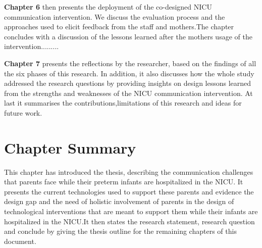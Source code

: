  \textbf{Chapter 6} then presents the deployment of the co-designed NICU communication intervention. We discuss the evaluation process and the approaches used to elicit feedback from the staff and mothers.The chapter concludes with a discussion of the lessons learned after the mothers usage of the intervention.........
 
  \textbf{Chapter 7} presents the reflections by the researcher, based on the findings of all the six phases of this research. In addition, it also discusses how the whole study addressed the research questions by providing insights on design lessons learned from the strengths and weaknesses of the NICU communication intervention. At last it summarises the contributions,limitations of this research and ideas for future work.
  

\section{Chapter Summary}
This chapter has introduced the thesis, describing the communication challenges that  parents face while their preterm infants are hospitalized in the NICU. It presents the current technologies used to support these parents and evidence the design gap and the need of holistic involvement of parents in the design of technological interventions that are meant to support them while their infants are hospitalized in the NICU.It then states the research statement, research question and conclude by giving the thesis outline  for the remaining chapters of this document.
 




